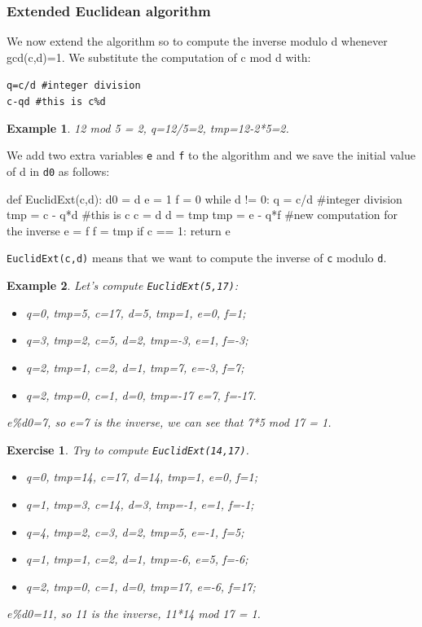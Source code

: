 \documentclass[a4paper, 12pt]{report}
\newtheorem{example}{\textbf{Example}}
\newtheorem{exercise}{\textbf{Exercise}}
\begin{document}
\subsubsection{Extended Euclidean algorithm}
We now extend the algorithm so to compute the inverse modulo d whenever gcd(c,d)=1. We substitute the computation of c mod d with:
\begin{center}
	\texttt{q=c/d \#integer division}\\
	\texttt{c-qd  \#this is c\%d}
\end{center}
\begin{example}
	12 mod 5 = 2, q=12/5=2, tmp=12-2*5=2.
\end{example}

We add two extra variables \texttt{e} and \texttt{f} to the algorithm and we save the initial value of d in \texttt{d0} as follows:
\begin{python}
def EuclidExt(c,d):
	d0 = d
	e = 1
	f = 0
	while d != 0:
		q = c/d					#integer division
		tmp = c - q*d		#this is c%
		c = d
		d = tmp
		tmp = e - q*f		#new computation for the inverse
		e = f
		f = tmp
	if c == 1:
		return e %
\end{python}

\texttt{EuclidExt(c,d)} means that we want to compute the inverse of \texttt{c} modulo \texttt{d}.

\begin{example}
	Let's compute \texttt{EuclidExt(5,17)}:
	\begin{itemize}
		\item q=0, tmp=5, c=17, d=5, tmp=1, e=0, f=1;
		\item q=3, tmp=2, c=5, d=2, tmp=-3, e=1, f=-3;
		\item q=2, tmp=1, c=2, d=1, tmp=7, e=-3, f=7;
		\item q=2, tmp=0, c=1, d=0, tmp=-17 e=7, f=-17.
	\end{itemize}
	e\%d0=7, so e=7 is the inverse, we can see that 7*5 mod 17 = 1.
\end{example}

\begin{exercise}
	Try to compute \texttt{EuclidExt(14,17)}.
	
	\begin{itemize}
		\item q=0, tmp=14, c=17, d=14, tmp=1, e=0, f=1;
		\item q=1, tmp=3, c=14, d=3, tmp=-1, e=1, f=-1;
		\item q=4, tmp=2, c=3, d=2, tmp=5, e=-1, f=5;
		\item q=1, tmp=1, c=2, d=1, tmp=-6, e=5, f=-6;
		\item q=2, tmp=0, c=1, d=0, tmp=17, e=-6, f=17;
	\end{itemize}
	e\%d0=11, so 11 is the inverse, 11*14 mod 17 = 1.
\end{exercise}
\end{document}

